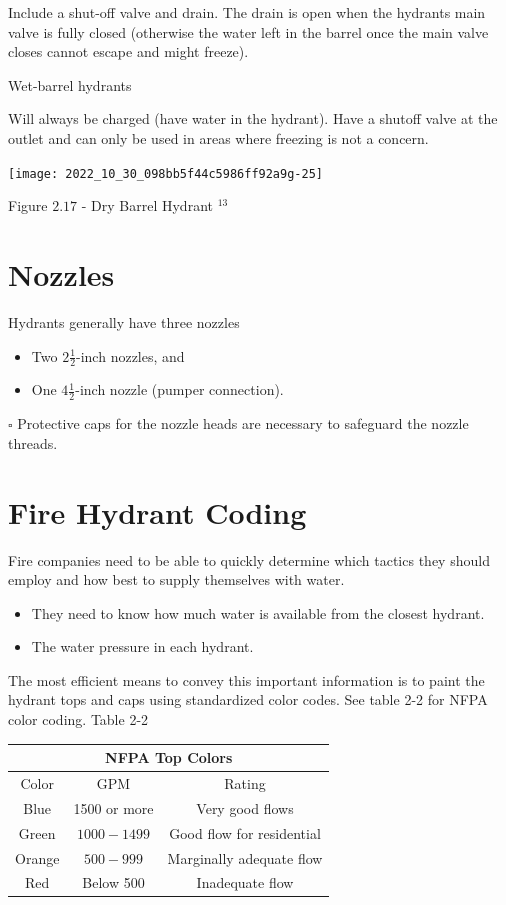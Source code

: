 \documentclass[10pt]{article}
\begin{document}
Include a shut-off valve and drain. The drain is open when the hydrants main valve is fully closed (otherwise the water left in the barrel once the main valve closes cannot escape and might freeze).

Wet-barrel hydrants

Will always be charged (have water in the hydrant). Have a shutoff valve at the outlet and can only be used in areas where freezing is not a concern.

\texttt{[image: 2022\_10\_30\_098bb5f44c5986ff92a9g-25]}

Figure $2.17$ - Dry Barrel Hydrant ${ }^{13}$

\section{Nozzles}
Hydrants generally have three nozzles

\begin{itemize}
  \item Two $2 \frac{1}{2}$-inch nozzles, and

  \item One $4 \frac{1}{2}$-inch nozzle (pumper connection).

\end{itemize}
$\square$ Protective caps for the nozzle heads are necessary to safeguard the nozzle threads.

\section{Fire Hydrant Coding}
Fire companies need to be able to quickly determine which tactics they should employ and how best to supply themselves with water.

\begin{itemize}
  \item They need to know how much water is available from the closest hydrant.

  \item The water pressure in each hydrant.

\end{itemize}
The most efficient means to convey this important information is to paint the hydrant tops and caps using standardized color codes. See table 2-2 for NFPA color coding. Table 2-2

\begin{tabular}{|c|c|c|}
\hline
\multicolumn{3}{|c|}{NFPA Top Colors} \\
\hline
Color & GPM & Rating \\
\hline
Blue & 1500 or more & Very good flows \\
\hline
Green & $1000-1499$ & Good flow for residential \\
\hline
Orange & $500-999$ & Marginally adequate flow \\
\hline
Red & Below 500 & Inadequate flow \\
\hline
\end{tabular}
\end{document}
